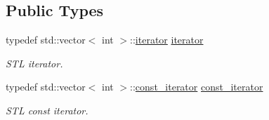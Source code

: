 \subsection*{Public Types}
\begin{DoxyCompactItemize}
\item 
typedef std\+::vector$<$ int $>$\+::\hyperlink{class_mdt_1_1_item_model_1_1_row_column_list_base_a9dc577333fcf542eda83d99b68fb4d05}{iterator} \hyperlink{class_mdt_1_1_item_model_1_1_row_column_list_base_a9dc577333fcf542eda83d99b68fb4d05}{iterator}\hypertarget{class_mdt_1_1_item_model_1_1_row_column_list_base_a9dc577333fcf542eda83d99b68fb4d05}{}\label{class_mdt_1_1_item_model_1_1_row_column_list_base_a9dc577333fcf542eda83d99b68fb4d05}

\begin{DoxyCompactList}\small\item\em S\+TL iterator. \end{DoxyCompactList}\item 
typedef std\+::vector$<$ int $>$\+::\hyperlink{class_mdt_1_1_item_model_1_1_row_column_list_base_ab6fc8d06705e4434201915f0c9860721}{const\+\_\+iterator} \hyperlink{class_mdt_1_1_item_model_1_1_row_column_list_base_ab6fc8d06705e4434201915f0c9860721}{const\+\_\+iterator}\hypertarget{class_mdt_1_1_item_model_1_1_row_column_list_base_ab6fc8d06705e4434201915f0c9860721}{}\label{class_mdt_1_1_item_model_1_1_row_column_list_base_ab6fc8d06705e4434201915f0c9860721}

\begin{DoxyCompactList}\small\item\em S\+TL const iterator. \end{DoxyCompactList}\end{DoxyCompactItemize}
